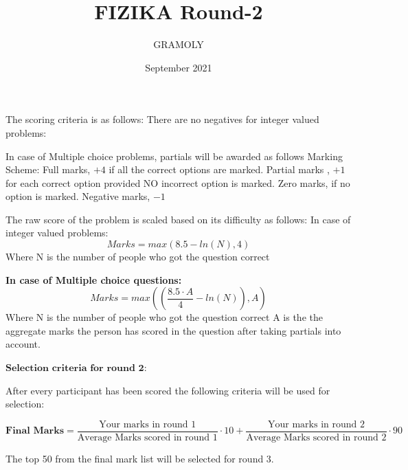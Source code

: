 \documentclass[11pt,a4paper]{scrartcl}
\title{FIZIKA Round-2}
\author{GRAMOLY}
\date{September 2021}
\begin{document}
\begin{tcolorbox}

The scoring criteria is as follows:
There are no negatives for integer valued problems:

In case of Multiple choice problems, partials will be awarded as follows
Marking Scheme:
Full marks, $+4$ if all the correct options are marked.
Partial marks , $+1$ for each correct option provided NO incorrect option is marked.
Zero marks, if no option is marked.
Negative marks, $-1$

The raw score of the problem is scaled based on its difficulty as follows:
In case of integer valued problems:
$$Marks = max(8.5-ln(N), 4)$$
Where N is the number of people who got the question correct

\textbf{In case of Multiple choice questions:}
$$Marks = max\left(\left(\frac{8.5\cdot A}{4}-ln(N)\right), A\right)$$
Where N is the number of people who got the question correct
A is the the aggregate marks the person has scored in the question after taking partials into account.

${\textbf{Selection criteria for round 2:}}$

After every participant has been scored the following criteria will be used for selection:

$$\textbf{Final Marks}=\frac{\text{Your marks in round $1$}}{\text{Average Marks scored in round $1$}}\cdot 10 + \frac{\text{Your marks in round $2$}}{\text{Average Marks scored in round $2$}}\cdot 90$$

The top 50 from the final mark list will be selected for round 3.
\end{tcolorbox}

\pagebreak
\vspace{10mm}
\vspace{10mm}%
\end{document}

